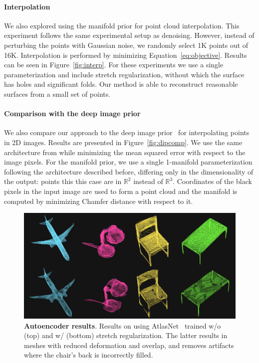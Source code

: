 \paragraph*{Interpolation} We also explored using the manifold prior for point cloud interpolation.
This experiment follows the same experimental setup as denoising.
However, instead of perturbing the points with Gaussian noise, we randomly select 1K points out of 16K.
Interpolation is performed by minimizing Equation~\ref{eq:objective}.
Results can be seen in Figure~\ref{fig:interp}.
For these experiments we use a single parameterization and include stretch regularization, without which the surface has holes and significant folds.
Our method is able to reconstruct reasonable surfaces from a small
set of points.

\paragraph*{Comparison with the deep image prior}
We also compare our approach to the deep image prior~\cite{dip} for interpolating points in 2D
images.
Results are presented in Figure~\ref{fig:dipcomp}.
We use the same architecture from \cite{dip} while minimizing
the mean squared error with respect to the image pixels.
For the manifold prior, we use a single 1-manifold parameterization following
the architecture described before, differing only in the dimensionality of the output: points this this case are in $\mathbb{R}^2$ instead of $\mathbb{R}^3$.
Coordinates of the black pixels in the input image are used to form a point cloud and 
the manifold is computed by minimizing Chamfer distance with respect to it.

\begin{figure}
\centering
\includegraphics[width=0.8\linewidth]{dmp/imgs/aestretch.pdf}
    \caption{\label{fig:aestretch} \small \textbf{Autoencoder results}.
    Results on using AtlasNet~\cite{atlasnet} trained w/o (top) and w/ (bottom) stretch regularization.
    The latter results in meshes with reduced deformation and overlap, and removes artifacts where the chair's back is incorrectly filled.
}
\end{figure}

